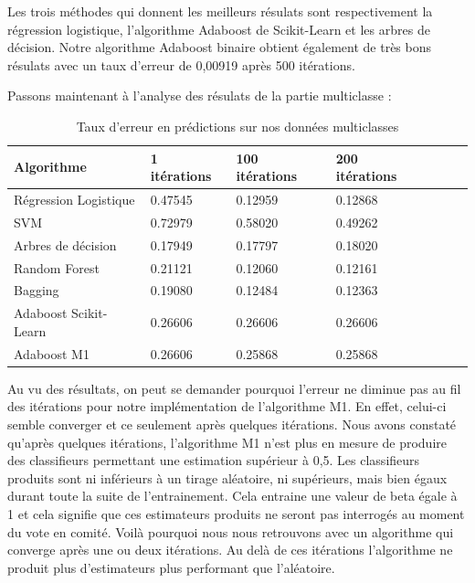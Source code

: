 \documentclass{article}
\begin{document}
Les trois méthodes qui donnent les meilleurs résulats sont respectivement la régression logistique, l'algorithme Adaboost de Scikit-Learn et les arbres de décision. Notre algorithme Adaboost binaire obtient également de très bons résulats avec un taux d'erreur de 0,00919 après 500 itérations. 

Passons maintenant à l'analyse des résulats de la partie multiclasse :

\begin{table}[htbp]
    \centering
    \small
    \setlength\tabcolsep{2pt}
    \begin{tabular}{| l | l | l | l | l | l | l |}
    \hline
    Algorithme & 1 itérations & 100 itérations & 200 itérations \\ \hline
    Régression Logistique & 0.47545 & 0.12959 & 0.12868 \\\hline
    SVM & 0.72979 & 0.58020 & 0.49262 \\ \hline
    Arbres de décision &  0.17949 & 0.17797 & 0.18020  \\ \hline
    Random Forest &  0.21121 & 0.12060 & 0.12161  \\ \hline
    Bagging & 0.19080 & 0.12484 & 0.12363 \\ \hline
    Adaboost Scikit-Learn & 0.26606 & 0.26606 & 0.26606 \\ \hline
    Adaboost M1 & 0.26606 & 0.25868 & 0.25868\\\hline
    \end{tabular}
    \caption{Taux d'erreur en prédictions sur nos données multiclasses}
\end{table}


Au vu des résultats, on peut se demander pourquoi l'erreur ne diminue pas au fil des itérations pour notre implémentation de l'algorithme M1. En effet, celui-ci semble converger et ce seulement après quelques itérations. 
Nous avons constaté qu'après quelques itérations, l'algorithme M1 n'est plus en mesure de produire des classifieurs permettant une estimation supérieur à 0,5. Les classifieurs produits sont ni inférieurs à un tirage aléatoire, ni supérieurs, mais bien égaux durant toute la suite de l'entrainement. Cela entraine une valeur de beta égale à 1 et cela signifie que ces estimateurs produits ne seront pas interrogés au moment du vote en comité. Voilà pourquoi nous nous retrouvons avec un algorithme qui converge après une ou deux itérations. Au delà de ces itérations l'algorithme ne produit plus d'estimateurs plus performant que l'aléatoire.\\ 
\end{document}
